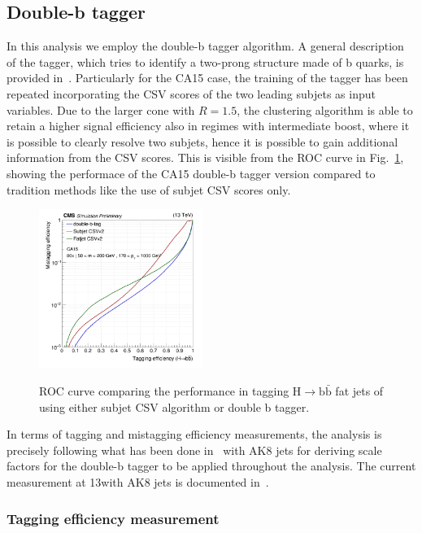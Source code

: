 \subsection{Double-b tagger}

In this analysis we employ the double-b tagger algorithm. A general description of the tagger, which tries to identify a two-prong structure made of b quarks, is provided in~\cite{CMS-PAS-BTV-15-002}. Particularly for the CA15 case, the training of the tagger has been repeated incorporating the CSV scores of the two leading subjets as input variables. Due to the larger cone with $R=1.5$, the clustering algorithm is able to retain a higher signal efficiency also in regimes with intermediate boost, where it is possible to clearly resolve two subjets, hence it is possible to gain additional information from the CSV scores. This is visible from the ROC curve in Fig.~\ref{fig:doublebroc}, showing the performace of the CA15 double-b tagger version compared to tradition methods like the use of subjet CSV scores only.


\begin{figure}
  \centering
  \includegraphics[width=0.475\textwidth]{figures/higgstagging/doubleb/doubleb_roc.png}\\
  \caption{ROC curve comparing the performance in tagging $\text{H}\to\text{b}\bar{\text{b}}$ fat jets of using either subjet CSV algorithm or double b tagger.}
  \label{fig:doublebroc}
\end{figure}


In terms of tagging and mistagging efficiency measurements, the analysis is precisely following what has been done in~\cite{CMS-PAS-BTV-15-002} with AK8 jets for deriving scale factors for the double-b tagger to be applied throughout the analysis. The current measurement at 13\TeV with AK8 jets is documented in~\cite{Ref:BTAG2016}.

\subsubsection{Tagging efficiency measurement}

